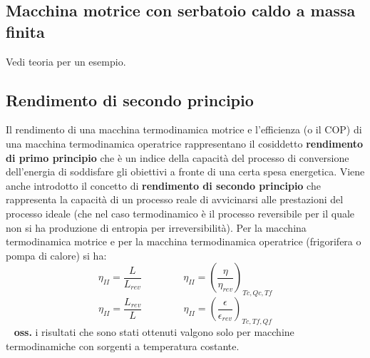 \subsection{Macchina motrice con serbatoio caldo a massa finita}
Vedi teoria per un esempio.
\subsection{Rendimento di secondo principio}
Il rendimento di una macchina termodinamica motrice e l’efficienza (o il COP) di una
macchina termodinamica operatrice rappresentano il cosiddetto \textbf{rendimento di primo
principio} che è un indice della capacità del processo di conversione dell’energia di soddisfare
gli obiettivi a fronte di una certa spesa energetica. \newline
\newline
Viene anche introdotto il concetto di \textbf{rendimento di secondo principio} che rappresenta la
capacità di un processo reale di avvicinarsi alle prestazioni del processo ideale (che nel caso
termodinamico è il processo reversibile per il quale non si ha produzione di entropia per
irreversibilità). Per la macchina termodinamica motrice e per la macchina termodinamica
operatrice (frigorifera o pompa di calore) si ha: 
\[
    \eta_{II} = \frac{L}{L_{rev}} \;\;\;\;\;\;\;\;\;\;\;\;\;\;\; \eta_{II} = \left(\frac{\eta}{\eta_{rev}}\right)_{Tc, Qc, Tf}
\]
\[
    \eta_{II} = \frac{L_{rev}}{L} \;\;\;\;\;\;\;\;\;\;\;\;\;\;\; \eta_{II} = \left(\frac{\epsilon}{\epsilon_{rev}}\right)_{Tc,Tf,Qf}
\]
\ \newline
\textbf{oss.} i risultati che sono stati ottenuti valgono solo per macchine termodinamiche con
sorgenti a temperatura costante. 